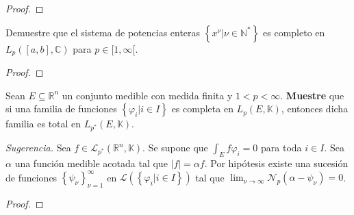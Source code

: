 \documentclass[12pt]{report}
\theoremstyle{largebreak}
\newcommand\abs[1]{\ensuremath{\big|#1\big|}}
\newcommand{\N}[2]{\ensuremath{\mathcal{N}_{#1}\left(#2\right)}}
\begin{document}
    \begin{proof}
        
    \end{proof}

    \begin{excer}
        Demuestre que el sistema de potencias enteras $\left\{x^\nu\Big|\nu\in\mathbb{N}^* \right\}$ es completo en $L_p([a,b],\mathbb{C})$ para $p\in[1,\infty[$.
    \end{excer}

    \begin{proof}
        
    \end{proof}

    \begin{excer}
        Sean $E\subseteq\mathbb{R}^n$ un conjunto medible con medida finita y $1<p<\infty$. \textbf{Muestre} que si una familia de funciones $\left\{\varphi_i\Big|i\in I \right\}$ es completa en $L_p(E,\mathbb{K})$, entonces dicha familia es total en $L_{p^*}(E,\mathbb{K})$.

        \textit{Sugerencia.} Sea $f\in\mathcal{L}_{p^*}(\mathbb{R}^n,\mathbb{K})$. Se supone que $\int_Ef\varphi_i=0$ para toda $i\in I$. Sea $\alpha$ una función medible acotada tal que $\abs{f}=\alpha f$. Por hipótesis existe una sucesión de funciones $\left\{\psi_\nu \right\}_{\nu=1}^\infty$ en $\mathcal{L}(\left\{\varphi_i\Big|i\in I \right\})$ tal que $\lim_{\nu\rightarrow\infty}\N{p}{\alpha-\psi_\nu}=0$.
    \end{excer}

    \begin{proof}
        
    \end{proof}
\end{document}
